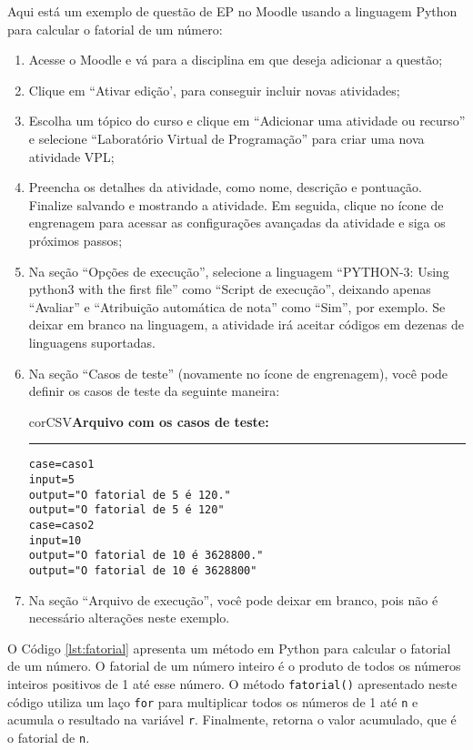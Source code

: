 Aqui está um exemplo de  questão de EP no Moodle usando a linguagem Python para calcular o fatorial de um número:
\begin{enumerate}
    \item Acesse o Moodle e vá para a disciplina em que deseja adicionar a questão;
  
    \item Clique em ``Ativar edição', para conseguir incluir novas atividades;
  
    \item Escolha um tópico do curso e clique em ``Adicionar uma atividade ou recurso'' e selecione ``Laboratório Virtual de Programação''  para criar uma nova atividade VPL;

    \item Preencha os detalhes da atividade, como nome, descrição e pontuação. Finalize salvando e mostrando a atividade. Em seguida, clique no ícone de engrenagem para acessar as configurações avançadas da atividade e siga os próximos passos;

    \item Na seção ``Opções de execução'', selecione a linguagem ``PYTHON-3: Using python3 with the first file'' como ``Script de execução'', deixando apenas ``Avaliar'' e ``Atribuição automática de nota'' como ``Sim'', por exemplo. Se deixar em branco na linguagem, a atividade irá aceitar códigos em dezenas de linguagens suportadas.

    \item Na seção ``Casos de teste'' (novamente no ícone de engrenagem), você pode definir os casos de teste da seguinte maneira:

\begin{myboxCode}{corCSV}{\textbf{Arquivo com os casos de teste:}}\vspace{3mm}
\hrule
\begin{verbatim}
case=caso1
input=5
output="O fatorial de 5 é 120."
output="O fatorial de 5 é 120"
case=caso2
input=10
output="O fatorial de 10 é 3628800."
output="O fatorial de 10 é 3628800"
\end{verbatim}
\end{myboxCode}

    \item Na seção ``Arquivo de execução'', você pode deixar em branco, pois não é necessário alterações neste exemplo.

\end{enumerate}

O Código \ref{lst:fatorial} apresenta um método em Python para calcular o fatorial de um número. O fatorial de um número inteiro é o produto de todos os números inteiros positivos de 1 até esse número.
%
O método \verb|fatorial()| apresentado neste código utiliza um laço \verb|for| para multiplicar todos os números de 1 até \verb|n| e acumula o resultado na variável \verb|r|. Finalmente, retorna o valor acumulado, que é o fatorial de \verb|n|.

